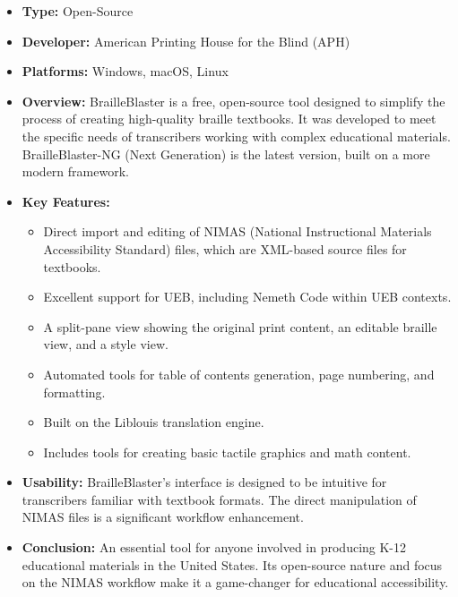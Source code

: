 \begin{itemize}
	\item \textbf{Type:} Open-Source
	\item \textbf{Developer:} American Printing House for the Blind (APH)
	\item \textbf{Platforms:} Windows, macOS, Linux
	\item \textbf{Overview:} BrailleBlaster \supercite{BrailleBlaster} is a free, open-source tool designed to simplify the process of creating high-quality braille textbooks. It was developed to meet the specific needs of transcribers working with complex educational materials. BrailleBlaster-NG (Next Generation) is the latest version, built on a more modern framework.
	\item \textbf{Key Features:}
	      \begin{itemize}
		      \item Direct import and editing of NIMAS (National Instructional Materials Accessibility Standard) files, which are XML-based source files for textbooks.
		      \item Excellent support for UEB, including Nemeth Code within UEB contexts.
		      \item A split-pane view showing the original print content, an editable braille view, and a style view.
		      \item Automated tools for table of contents generation, page numbering, and formatting.
		      \item Built on the Liblouis translation engine.
		      \item Includes tools for creating basic tactile graphics and math content.
	      \end{itemize}
	\item \textbf{Usability:} BrailleBlaster's interface is designed to be intuitive for transcribers familiar with textbook formats. The direct manipulation of NIMAS files is a significant workflow enhancement.
	\item \textbf{Conclusion:} An essential tool for anyone involved in producing K-12 educational materials in the United States. Its open-source nature and focus on the NIMAS workflow make it a game-changer for educational accessibility.
\end{itemize}

